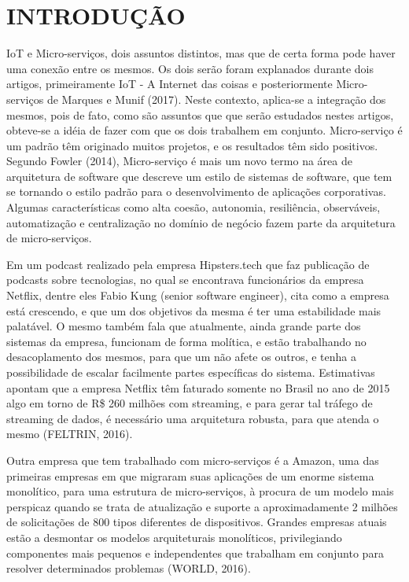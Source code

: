 \section{INTRODUÇÃO}

IoT e Micro-serviços, dois assuntos distintos, mas que de certa forma pode haver uma conexão entre os mesmos. Os dois serão foram explanados durante dois artigos, primeiramente IoT - A Internet das coisas e posteriormente Micro-serviços de Marques e Munif (2017). Neste contexto, aplica-se a integração dos mesmos, pois de fato, como são assuntos que que serão estudados nestes artigos, obteve-se a idéia de fazer com que os dois trabalhem em conjunto. Micro-serviço é um padrão têm originado muitos projetos, e os resultados têm sido positivos. Segundo Fowler (2014), Micro-serviço é mais um novo termo na área de arquitetura de software que descreve um estilo de sistemas de software, que tem se tornando o estilo padrão para o desenvolvimento de aplicações corporativas. Algumas características como alta coesão, autonomia, resiliência, observáveis, automatização e centralização no domínio de negócio fazem parte da arquitetura de micro-serviços. 

Em um podcast realizado pela empresa Hipsters.tech que faz publicação de podcasts sobre tecnologias, no qual se encontrava funcionários da empresa Netflix, dentre eles Fabio Kung (senior software engineer), cita como a empresa está crescendo, e que um dos objetivos da mesma é ter uma estabilidade mais palatável. O mesmo também fala que atualmente, ainda grande parte dos sistemas da empresa, funcionam de forma molítica, e estão trabalhando no desacoplamento dos mesmos, para que um não afete os outros, e tenha a possibilidade de escalar facilmente partes específicas do sistema. Estimativas apontam que a empresa Netflix têm faturado somente no Brasil no ano de 2015 algo em torno de R\$ 260 milhões com streaming, e para gerar tal tráfego de streaming de dados, é necessário uma arquitetura robusta, para que atenda o mesmo (FELTRIN, 2016).

Outra empresa que tem trabalhado com micro-serviços é a Amazon, uma das primeiras empresas em que migraram suas aplicações de um enorme sistema monolítico, para uma estrutura de micro-serviços, à procura de um modelo mais perspicaz quando se trata de atualização e suporte a aproximadamente 2 milhões de solicitações de 800 tipos diferentes de dispositivos. Grandes empresas atuais estão a desmontar os modelos arquiteturais monolíticos, privilegiando componentes mais pequenos e independentes que trabalham em conjunto para resolver determinados problemas (WORLD, 2016).

